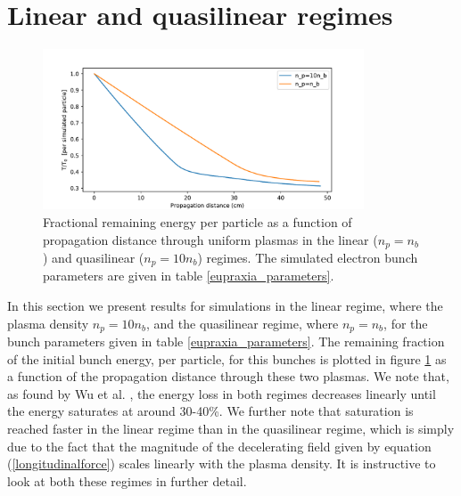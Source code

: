 \section{Linear and quasilinear regimes}
\begin{figure}
\centering
\includegraphics[width=0.85\textwidth]{Energy30pc_per_particle_lowres2.pdf}
\caption{\small{Fractional remaining energy per particle as a function of propagation distance through uniform plasmas in the linear ($n_p=n_b$) and quasilinear ($n_p=10n_b$) regimes. The simulated electron bunch parameters are given in table \ref{eupraxia_parameters}.}}
\label{energyloss}
\end{figure}
In this section we present results for simulations in the linear regime, where the plasma density $n_p=10n_b$, and the quasilinear regime, where $n_p=n_b$, for the bunch parameters given  in table \ref{eupraxia_parameters}. The remaining fraction of the initial bunch energy, per particle, for this bunches is plotted in figure \ref{energyloss} as a function of the propagation distance through these two plasmas. We note that, as found by Wu et al. \cite{Wu2010}, the energy loss in both regimes decreases linearly until the energy saturates at around 30-40\%. We further note that saturation is reached faster in the linear regime than in the quasilinear regime, which is simply due to the fact that the magnitude of the decelerating field given by equation (\ref{longitudinalforce}) scales linearly with the plasma density. It is instructive to look at both these regimes in further detail.\\
